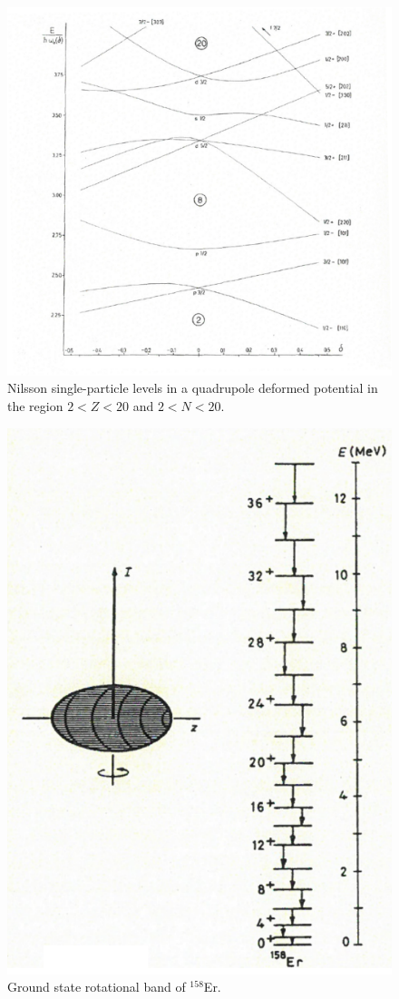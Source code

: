 \begin{figure}
	\centerline {
		\includegraphics*[width=15cm, angle=0.]{introduccion/figs/fig0_4_2_v4}
	}
	\caption{Nilsson single-particle levels in a quadrupole deformed potential in the region $2<Z<20$ and $2<N<20$.}
	\label{fig0.4.1}
\end{figure}
\begin{figure}
	\centerline {
		\includegraphics*[width=12cm, angle=0.]{introduccion/figs/fig0_4_2_v3}
	}
	\caption{Ground state rotational band of $^{158}$Er.}
	\label{fig0.4.2}
\end{figure}
